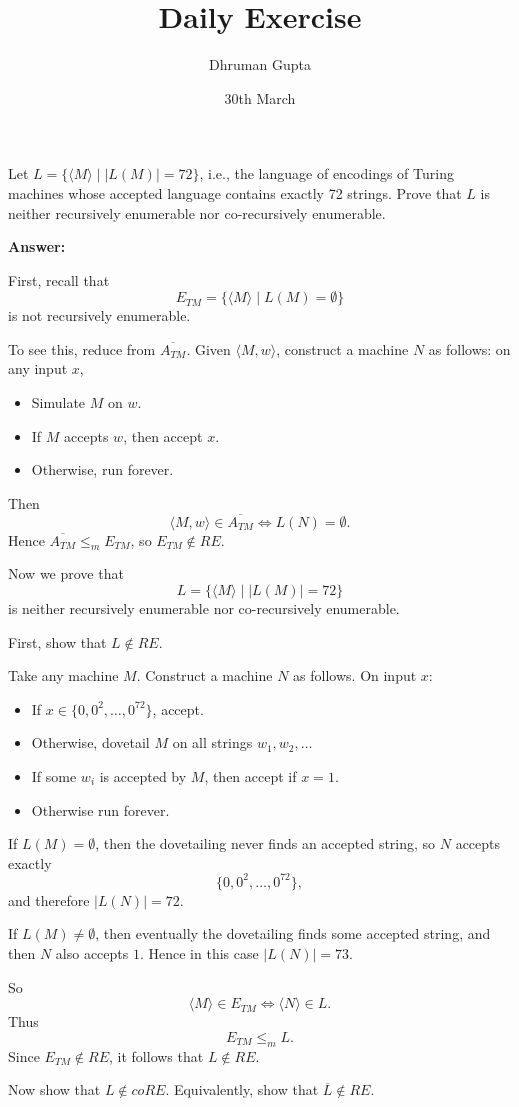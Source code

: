 \documentclass[11pt]{article}
\title{Daily Exercise}
\author{Dhruman Gupta}
\date{30th March}
\begin{document}

Let $L=\{\langle M\rangle \mid |L(M)|=72\}$, i.e., the language of encodings of Turing machines whose accepted language contains exactly 72 strings. Prove that $L$ is neither recursively enumerable nor co-recursively enumerable.

\textbf{Answer:}

First, recall that
\[
E_{TM} = \{\langle M \rangle \mid L(M) = \emptyset\}
\]
is not recursively enumerable.

To see this, reduce from $\overline{A_{TM}}$. Given $\langle M,w \rangle$, construct a machine $N$ as follows: on any input $x$,
\begin{itemize}
    \item Simulate $M$ on $w$.
    \item If $M$ accepts $w$, then accept $x$.
    \item Otherwise, run forever.
\end{itemize}
Then
\[
\langle M,w \rangle \in \overline{A_{TM}} \iff L(N)=\emptyset.
\]
Hence $\overline{A_{TM}} \leq_m E_{TM}$, so $E_{TM} \notin RE$.

Now we prove that
\[
L = \{\langle M \rangle \mid |L(M)| = 72\}
\]
is neither recursively enumerable nor co-recursively enumerable.

First, show that $L \notin RE$.

Take any machine $M$. Construct a machine $N$ as follows. On input $x$:
\begin{itemize}
    \item If $x \in \{0,0^2,\dots,0^{72}\}$, accept.
    \item Otherwise, dovetail $M$ on all strings $w_1,w_2,\dots$
    \item If some $w_i$ is accepted by $M$, then accept if $x=1$.
    \item Otherwise run forever.
\end{itemize}

If $L(M)=\emptyset$, then the dovetailing never finds an accepted string, so $N$ accepts exactly
\[
\{0,0^2,\dots,0^{72}\},
\]
and therefore $|L(N)|=72$.

If $L(M)\neq \emptyset$, then eventually the dovetailing finds some accepted string, and then $N$ also accepts $1$. Hence in this case $|L(N)|=73$.

So
\[
\langle M \rangle \in E_{TM} \iff \langle N \rangle \in L.
\]
Thus
\[
E_{TM} \leq_m L.
\]
Since $E_{TM}\notin RE$, it follows that $L\notin RE$.

Now show that $L \notin coRE$. Equivalently, show that $\overline{L}\notin RE$.
\end{document}
